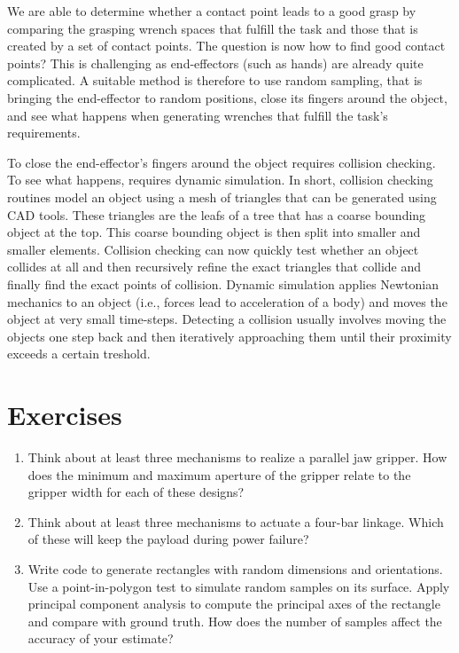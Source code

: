 We are able to determine whether a contact point leads to a good grasp by comparing the grasping wrench spaces that fulfill the task and those that is created by a set of contact points. The question is now how to find good contact points? This is challenging as end-effectors (such as hands) are already quite complicated. A suitable method is therefore to use random sampling, that is bringing the end-effector to random positions, close its fingers around the object, and see what happens when generating wrenches that fulfill the task's requirements.

To close the end-effector's fingers around the object requires collision checking. To see what happens, requires dynamic simulation. In short, collision checking routines model an object using a mesh of triangles that can be generated using CAD tools. These triangles are the leafs of a tree that has a coarse bounding object at the top. This coarse bounding object is then split into smaller and smaller elements. Collision checking can now quickly test whether an object collides at all and then recursively refine the exact triangles that collide and finally find the exact points of collision. Dynamic simulation applies Newtonian mechanics to an object (i.e., forces lead to acceleration of a body) and moves the object at very small time-steps. Detecting a collision usually involves moving the objects one step back and then iteratively approaching them until their proximity exceeds a certain treshold.

\section{Exercises}
\begin{enumerate}
\item Think about at least three mechanisms to realize a parallel jaw gripper. How does the minimum and maximum aperture of the gripper relate to the gripper width for each of these designs?
\item Think about at least three mechanisms to actuate a four-bar linkage. Which of these will keep the payload during power failure?
\item Write code to generate rectangles with random dimensions and orientations. Use a point-in-polygon test to simulate random samples on its surface. Apply principal component analysis to compute the principal axes of the rectangle and compare with ground truth. How does the number of samples affect the accuracy of your estimate?
\end{enumerate}
